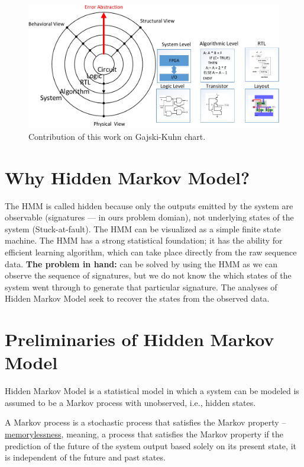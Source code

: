 \begin{figure}[tb!]

 \centering
  \captionsetup{justification=centering}    
   \includegraphics[scale=0.8]{Figures/ychart-block.pdf}
   \caption{Contribution of this work on Gajski-Kuhn chart.}
\label{fig:ychart}
\end{figure}

\section{Why Hidden Markov Model?}

The HMM is called hidden because only the outputs emitted by the system are observable (signatures --- in ours problem domian), not underlying states of the system (Stuck-at-fault). The HMM can be visualized as a simple finite state machine. The HMM has a strong statistical foundation; it has the ability for efficient learning algorithm, which can take place directly from the raw sequence data. \textbf{The problem in hand:} can be solved by using the HMM as we can observe the sequence of signatures, but we do not know the which states of the system went through to generate that particular signature. The analyses of Hidden Markov Model seek to recover the states from the observed data.



\section{Preliminaries of Hidden Markov Model}


Hidden Markov Model is a statistical model in which a system can be modeled is assumed to be a Markov process with unobserved, i.e., hidden states. 

\begin{tcolorbox}[width=\textwidth,colback={gray},title={Markov Process},colbacktitle=gray,coltitle=black]  

A Markov process  is a stochastic process that satisfies the Markov property -- \underline{memorylessness}, meaning, a process that satisfies the Markov property if the prediction of the future of the system output based solely on its present state, it is independent of the future and past states.   
\end{tcolorbox}


